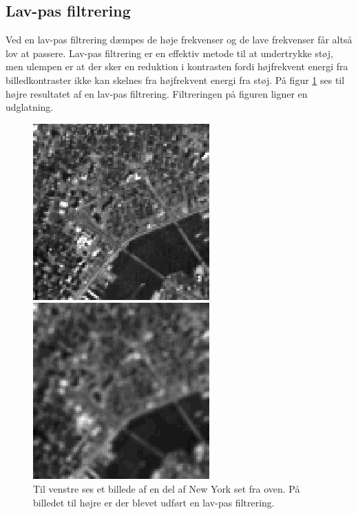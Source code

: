 \subsection{Lav-pas filtrering}
Ved en lav-pas filtrering dæmpes de høje frekvenser og de lave frekvenser får altså lov at passere. Lav-pas filtrering er en effektiv metode til at undertrykke støj, men ulempen er at der sker en reduktion i kontrasten fordi højfrekvent energi fra billedkontraster ikke kan skelnes fra højfrekvent energi fra støj. På figur \ref{fig:low_pass} ses til højre resultatet af en lav-pas filtrering. Filtreringen på figuren ligner en udglatning.
\begin{figure}[H]
	\begin{minipage}[b]{0.5\linewidth}
		\centering
		\includegraphics[scale=0.5]{files/bildbeh/img/new_york.jpg}
	\end{minipage}
	\hspace{0.5cm}
	\begin{minipage}[b]{0.5\linewidth}
		\centering
		\includegraphics[scale=0.5]{files/bildbeh/img/lowpass.jpg}
	\end{minipage}
	\caption{Til venstre ses et billede af en del af New York set fra oven. På billedet til højre er der blevet udført en lav-pas filtrering\cite{newyork}.\label{fig:low_pass}}
\end{figure}


